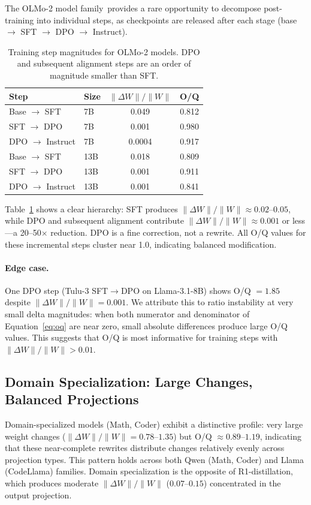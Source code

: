 \documentclass[11pt]{article}
\newcommand{\dwnorm}{\|\Delta W\|/\|W\|}
\begin{document}
The OLMo-2 model family~provides a rare opportunity to decompose
post-training into individual steps, as checkpoints are released after each
stage (base $\to$ SFT $\to$ DPO $\to$ Instruct).

\begin{table}[h]
\centering
\caption{Training step magnitudes for OLMo-2 models.
DPO and subsequent alignment steps are an order of magnitude smaller than SFT.}
\label{tab:dpo}
\begin{tabular}{llcc}
\toprule
Step & Size & $\dwnorm$ & O/Q \\
\midrule
Base $\to$ SFT & 7B & 0.049 & 0.812 \\
SFT $\to$ DPO & 7B & 0.001 & 0.980 \\
DPO $\to$ Instruct & 7B & 0.0004 & 0.917 \\
\midrule
Base $\to$ SFT & 13B & 0.018 & 0.809 \\
SFT $\to$ DPO & 13B & 0.001 & 0.911 \\
DPO $\to$ Instruct & 13B & 0.001 & 0.841 \\
\bottomrule
\end{tabular}
\end{table}

Table~\ref{tab:dpo} shows a clear hierarchy: SFT produces $\dwnorm \approx
0.02$--$0.05$, while DPO and subsequent alignment contribute $\dwnorm \approx
0.001$ or less---a 20--50$\times$ reduction.
DPO is a fine correction, not a rewrite.
All O/Q values for these incremental steps cluster near 1.0, indicating
balanced modification.

\paragraph{Edge case.}
One DPO step (Tulu-3 SFT$\to$DPO on Llama-3.1-8B) shows O/Q $= 1.85$ despite
$\dwnorm = 0.001$.
We attribute this to ratio instability at very small delta magnitudes: when both
numerator and denominator of Equation~\ref{eq:oq} are near zero, small absolute
differences produce large O/Q values.
This suggests that O/Q is most informative for training steps with
$\dwnorm > 0.01$.


\subsection{Domain Specialization: Large Changes, Balanced Projections}

Domain-specialized models (Math, Coder) exhibit a distinctive profile:
very large weight changes ($\dwnorm = 0.78$--$1.35$) but O/Q $\approx 0.89$--$1.19$,
indicating that these near-complete rewrites distribute changes relatively evenly
across projection types.
This pattern holds across both Qwen (Math, Coder) and Llama (CodeLlama) families.
Domain specialization is the opposite of R1-distillation, which produces moderate
$\dwnorm$ ($0.07$--$0.15$) concentrated in the output projection.
\end{document}
